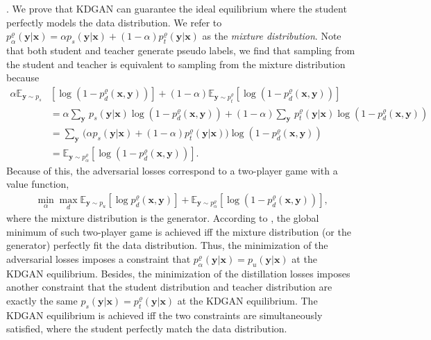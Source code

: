 \documentclass{article}
\newcommand{\OVEC}[1]{\bm{#1}} %
\newcommand{\EXP}{\mathbb{E}} %
\newcommand{\abbrpdat}{p_{u}}
\newcommand{\fullpdat}{p_{u}(\OVEC{y}|\OVEC{x})}
\newcommand{\abbrpstd}{p_{s}}
\newcommand{\fullpstd}[1]{p_{s}(#1|\OVEC{x})}
\newcommand{\abbrptch}{p_{t}^{\varrho}}
\newcommand{\fullptch}[1]{p_{t}^{\varrho}(#1|\OVEC{x})}
\newcommand{\fullpdis}[1]{p_{d}^{\varrho}(\OVEC{x},#1)}
\newcommand{\abbrpmix}{p_{\alpha}^{\varrho}}
\newcommand{\fullpmix}{p_{\alpha}^{\varrho}(\OVEC{y}|\OVEC{x})}
\begin{document}
.
We prove that KDGAN can guarantee the ideal equilibrium where the student perfectly models the data distribution.
We refer to $\fullpmix=\alpha\fullpstd{\OVEC{y}}+(1-\alpha)\fullptch{\OVEC{y}}$ as the \emph{mixture distribution}.
Note that both student and teacher generate pseudo labels, we find that sampling from the student and teacher is equivalent to sampling from the mixture distribution because 
\begin{equation}
\begin{aligned}
\alpha\EXP_{\OVEC{y}\sim\abbrpstd}
&
[\log(1-\fullpdis{\OVEC{y}})]
+
(1-\alpha)\EXP_{\OVEC{y}\sim\abbrptch}[\log(1-\fullpdis{\OVEC{y}})]
\\
&=
\alpha{\textstyle\sum}_{\OVEC{y}}\,
\fullpstd{\OVEC{y}}\log(1-\fullpdis{\OVEC{y}})
+
(1-\alpha){\textstyle\sum}_{\OVEC{y}}\,
\fullptch{\OVEC{y}}\log(1-\fullpdis{\OVEC{y}})
\\
&=
{\textstyle\sum}_{\OVEC{y}}\,
\big(\alpha\fullpstd{\OVEC{y}}+(1-\alpha)\fullptch{\OVEC{y}}\big)
\log(1-\fullpdis{\OVEC{y}})
\\
&=
\EXP_{\OVEC{y}\sim\abbrpmix}[\log(1-\fullpdis{\OVEC{y}})]
\text{.}
\end{aligned}
\end{equation}
Because of this, the adversarial losses correspond to a two-player game with a value function,
\begin{equation}
\begin{aligned}
\min_{\alpha}
\max_{d}
\EXP_{\OVEC{y}\sim\abbrpdat}[\log\fullpdis{\OVEC{y}}]
+
\EXP_{\OVEC{y}\sim\abbrpmix}[\log(1-\fullpdis{\OVEC{y}})]
\text{,}
\end{aligned}
\end{equation}%
where the mixture distribution is the generator.
According to \cite{goodfellow2014generative,wang2017irgan}, the global minimum of such two-player game is achieved iff the mixture distribution (or the generator) perfectly fit the data distribution.
Thus, the minimization of the adversarial losses imposes a constraint that $\fullpmix=\fullpdat$ at the KDGAN equilibrium.
Besides, the minimization of the distillation losses imposes another constraint that the student distribution and teacher distribution are exactly the same $\fullpstd{\OVEC{y}}=\fullptch{\OVEC{y}}$ at the KDGAN equilibrium.
The KDGAN equilibrium is achieved iff the two constraints are simultaneously satisfied, where the student perfectly match the data distribution.
\end{document}

